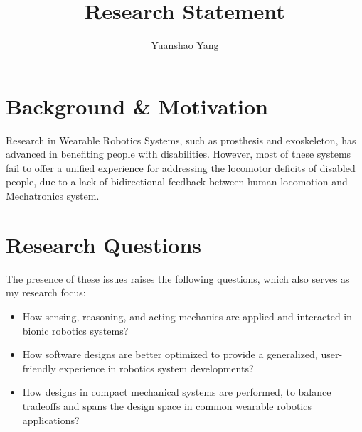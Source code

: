 \documentclass[8pt]{article}
\title{Research Statement}
\author{Yuanshao Yang}
\begin{document}
\maketitle


\section{Background \& Motivation}


Research in Wearable Robotics Systems, such as prosthesis and exoskeleton, has advanced in benefiting people with disabilities. However, most of these systems fail to offer a unified experience for addressing the locomotor deficits of disabled people, due to a lack of bidirectional feedback between human locomotion and Mechatronics system. 


\section{Research Questions}


The presence of these issues raises the following questions, which also serves as my research focus: 

\begin{itemize}
            
    
    \item {How sensing, reasoning, and acting mechanics are applied and interacted in bionic robotics systems?}
    \item {How software designs are better optimized to provide a generalized, user-friendly experience in robotics system developments?}
    \item {How designs in compact mechanical systems are performed, to balance tradeoffs and spans the design space in common wearable robotics applications?}
    

\end{itemize}
\end{document}
